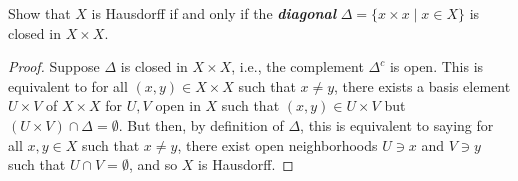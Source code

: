\documentclass[12pt]{article}
\theoremstyle{remark}
\begin{document}
\setcounter{subsubsection}{12}
\begin{problem}\label{exc:17.13}
  Show that $X$ is Hausdorff if and only if the \emph{\textbf{diagonal}} $\Delta = \{x \times x \mid x \in X\}$ is closed in $X \times X$.
\end{problem}
\begin{proof}
  Suppose $\Delta$ is closed in $X \times X$, i.e., the complement $\Delta^c$ is
  open. This is equivalent to for all $(x,y) \in X \times X$ such that $x \ne
  y$, there exists a basis element $U \times V$ of $X \times X$ for $U,V$ open
  in $X$ such that $(x,y) \in U \times V$ but $(U \times V) \cap \Delta =
  \emptyset$. But then, by definition of $\Delta$, this is equivalent to saying
  for all $x,y \in X$ such that $x \ne y$, there exist open neighborhoods $U \ni x$
  and $V \ni y$ such that $U \cap V = \emptyset$, and so $X$ is Hausdorff.
\end{proof}
\end{document}
